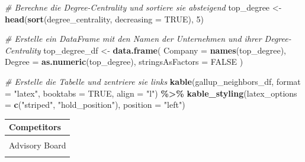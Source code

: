 \documentclass[
]{article}
\newenvironment{Shaded}{\begin{snugshade}}{\end{snugshade}}
\newcommand{\AttributeTok}[1]{\textcolor[rgb]{0.13,0.29,0.53}{#1}}
\newcommand{\CommentTok}[1]{\textcolor[rgb]{0.56,0.35,0.01}{\textit{#1}}}
\newcommand{\ConstantTok}[1]{\textcolor[rgb]{0.56,0.35,0.01}{#1}}
\newcommand{\DecValTok}[1]{\textcolor[rgb]{0.00,0.00,0.81}{#1}}
\newcommand{\FunctionTok}[1]{\textcolor[rgb]{0.13,0.29,0.53}{\textbf{#1}}}
\newcommand{\NormalTok}[1]{#1}
\newcommand{\OtherTok}[1]{\textcolor[rgb]{0.56,0.35,0.01}{#1}}
\newcommand{\SpecialCharTok}[1]{\textcolor[rgb]{0.81,0.36,0.00}{\textbf{#1}}}
\newcommand{\StringTok}[1]{\textcolor[rgb]{0.31,0.60,0.02}{#1}}
\begin{document}
\begin{Shaded}
\begin{Highlighting}[]
\CommentTok{\# Berechne die Degree{-}Centrality und sortiere sie absteigend}
\NormalTok{top\_degree }\OtherTok{\textless{}{-}} \FunctionTok{head}\NormalTok{(}\FunctionTok{sort}\NormalTok{(degree\_centrality, }\AttributeTok{decreasing =} \ConstantTok{TRUE}\NormalTok{), }\DecValTok{5}\NormalTok{)}

\CommentTok{\# Erstelle ein DataFrame mit den Namen der Unternehmen und ihrer Degree{-}Centrality}
\NormalTok{top\_degree\_df }\OtherTok{\textless{}{-}} \FunctionTok{data.frame}\NormalTok{(}
  \AttributeTok{Company =} \FunctionTok{names}\NormalTok{(top\_degree),}
  \AttributeTok{Degree =} \FunctionTok{as.numeric}\NormalTok{(top\_degree),}
  \AttributeTok{stringsAsFactors =} \ConstantTok{FALSE}
\NormalTok{)}

\CommentTok{\# Erstelle die Tabelle und zentriere sie links}
\FunctionTok{kable}\NormalTok{(gallup\_neighbors\_df, }\AttributeTok{format =} \StringTok{"latex"}\NormalTok{, }\AttributeTok{booktabs =} \ConstantTok{TRUE}\NormalTok{, }\AttributeTok{align =} \StringTok{"l"}\NormalTok{) }\SpecialCharTok{\%\textgreater{}\%}
  \FunctionTok{kable\_styling}\NormalTok{(}\AttributeTok{latex\_options =} \FunctionTok{c}\NormalTok{(}\StringTok{"striped"}\NormalTok{, }\StringTok{"hold\_position"}\NormalTok{), }\AttributeTok{position =} \StringTok{"left"}\NormalTok{)}
\end{Highlighting}
\end{Shaded}

\begin{tabular}{l}
\toprule
Competitors\\
\midrule
\cellcolor{gray!10}{Booz Allen Hamilton}\\
Advisory Board\\
\cellcolor{gray!10}{McKinsey \& Company}\\
\bottomrule
\end{tabular}
\end{document}
